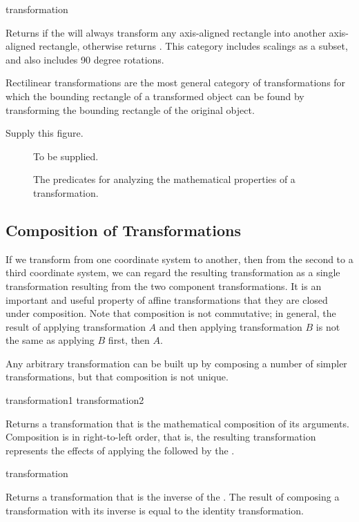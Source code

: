  {transformation}

Returns  if the   will
always transform any axis-aligned rectangle into another axis-aligned rectangle,
otherwise returns .  This category includes scalings as a subset,
and also includes 90 degree rotations.

Rectilinear transformations are the most general category of transformations for
which the bounding rectangle of a transformed object can be found by
transforming the bounding rectangle of the original object.

 {Supply this figure.}

\begin{figure}
\centerline{To be supplied.}
\caption{The predicates for analyzing the mathematical properties of a transformation.}  
\end{figure}


\subsection {Composition of Transformations}

If we transform from one coordinate system to another, then from the second to a
third coordinate system, we can regard the resulting transformation as a single
transformation resulting from  the two component
transformations.  It is an important and useful property of affine transformations
that they are closed under composition.  Note that composition is not commutative;
in general, the result of applying transformation $A$ and then applying
transformation $B$ is not the same as applying $B$ first, then $A$.

Any arbitrary transformation can be built up by composing a number of simpler
transformations, but that composition is not unique.

 {transformation1 transformation2}

Returns a transformation that is the mathematical composition of its arguments.
Composition is in right-to-left order, that is, the resulting transformation
represents the effects of applying the 
 followed by the 
.

 {transformation}

Returns a transformation that is the inverse of the 
.  The result of composing a transformation with its inverse
is equal to the identity transformation.

